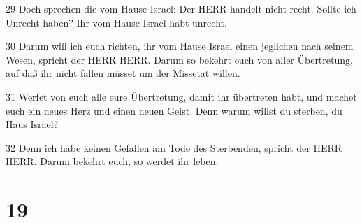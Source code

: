 \par 29 Doch sprechen die vom Hause Israel: Der HERR handelt nicht recht. Sollte ich Unrecht haben? Ihr vom Hause Israel habt unrecht.
\par 30 Darum will ich euch richten, ihr vom Hause Israel einen jeglichen nach seinem Wesen, spricht der HERR HERR. Darum so bekehrt euch von aller Übertretung, auf daß ihr nicht fallen müsset um der Missetat willen.
\par 31 Werfet von euch alle eure Übertretung, damit ihr übertreten habt, und machet euch ein neues Herz und einen neuen Geist. Denn warum willst du sterben, du Haus Israel?
\par 32 Denn ich habe keinen Gefallen am Tode des Sterbenden, spricht der HERR HERR. Darum bekehrt euch, so werdet ihr leben.

\chapter{19}

